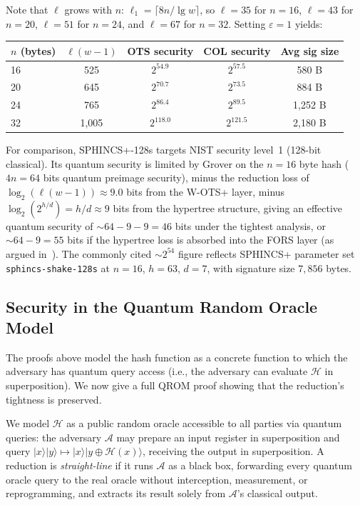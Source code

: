 \documentclass[11pt]{article}
\newcommand{\hash}{\mathcal{H}}
\begin{document}
Note that $\ell$ grows with $n$: $\ell_1 = \lceil 8n / \lg w \rceil$,
so $\ell = 35$ for $n = 16$, $\ell = 43$ for $n = 20$, $\ell = 51$ for
$n = 24$, and $\ell = 67$ for $n = 32$.
Setting $\varepsilon = 1$ yields:

\begin{center}
\begin{tabular}{lcccc}
\toprule
$n$ (bytes) & $\ell(w-1)$ & OTS security & COL security &
Avg sig size \\
\midrule
16 & 525 & $2^{54.9}$ & $2^{57.5}$ & 580 B \\
20 & 645 & $2^{70.7}$ & $2^{73.5}$ & 884 B \\
24 & 765 & $2^{86.4}$ & $2^{89.5}$ & 1,252 B \\
32 & 1,005 & $2^{118.0}$ & $2^{121.5}$ & 2,180 B \\
\bottomrule
\end{tabular}
\end{center}

For comparison, SPHINCS+-128s targets NIST security level~1 (128-bit
classical). Its quantum security is limited by Grover on the $n = 16$
byte hash ($4n = 64$ bits quantum preimage security), minus the
reduction loss of $\log_2(\ell(w-1)) \approx 9.0$ bits from the
W-OTS+ layer, minus $\log_2(2^{h/d}) = h/d \approx 9$ bits from the
hypertree structure, giving an effective quantum security of
${\sim}64 - 9 - 9 = 46$ bits under the tightest analysis, or
${\sim}64 - 9 = 55$ bits if the hypertree loss is absorbed into the
FORS layer (as argued in~\cite{sphincs}). The commonly cited
${\sim}2^{54}$ figure reflects SPHINCS+ parameter set
\texttt{sphincs-shake-128s} at $n = 16$, $h = 63$, $d = 7$, with
signature size $7{,}856$ bytes.

\subsection{Security in the Quantum Random Oracle Model}\label{sec:qrom}

The proofs above model the hash function as a concrete function to
which the adversary has quantum query access (i.e., the adversary can
evaluate $\hash$ in superposition). We now give a full QROM proof
showing that the reduction's tightness is preserved.

We model $\hash$ as a public random oracle accessible to all
parties via quantum queries: the adversary $\mathcal{A}$ may prepare an
input register in superposition and query
$|x\rangle|y\rangle \mapsto |x\rangle|y \oplus \hash(x)\rangle$,
receiving the output in superposition. A reduction is
\emph{straight-line} if it runs $\mathcal{A}$ as a black box,
forwarding every quantum oracle query to the real oracle without
interception, measurement, or reprogramming, and extracts its result
solely from $\mathcal{A}$'s classical output.
\end{document}
